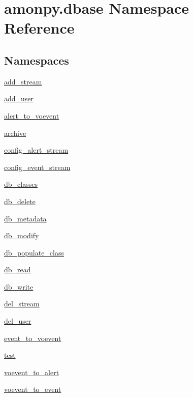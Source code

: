 \hypertarget{namespaceamonpy_1_1dbase}{\section{amonpy.\-dbase Namespace Reference}
\label{namespaceamonpy_1_1dbase}
}
\subsection*{Namespaces}
\begin{DoxyCompactItemize}
\item 
\hyperlink{namespaceamonpy_1_1dbase_1_1add__stream}{add\-\_\-stream}
\item 
\hyperlink{namespaceamonpy_1_1dbase_1_1add__user}{add\-\_\-user}
\item 
\hyperlink{namespaceamonpy_1_1dbase_1_1alert__to__voevent}{alert\-\_\-to\-\_\-voevent}
\item 
\hyperlink{namespaceamonpy_1_1dbase_1_1archive}{archive}
\item 
\hyperlink{namespaceamonpy_1_1dbase_1_1config__alert__stream}{config\-\_\-alert\-\_\-stream}
\item 
\hyperlink{namespaceamonpy_1_1dbase_1_1config__event__stream}{config\-\_\-event\-\_\-stream}
\item 
\hyperlink{namespaceamonpy_1_1dbase_1_1db__classes}{db\-\_\-classes}
\item 
\hyperlink{namespaceamonpy_1_1dbase_1_1db__delete}{db\-\_\-delete}
\item 
\hyperlink{namespaceamonpy_1_1dbase_1_1db__metadata}{db\-\_\-metadata}
\item 
\hyperlink{namespaceamonpy_1_1dbase_1_1db__modify}{db\-\_\-modify}
\item 
\hyperlink{namespaceamonpy_1_1dbase_1_1db__populate__class}{db\-\_\-populate\-\_\-class}
\item 
\hyperlink{namespaceamonpy_1_1dbase_1_1db__read}{db\-\_\-read}
\item 
\hyperlink{namespaceamonpy_1_1dbase_1_1db__write}{db\-\_\-write}
\item 
\hyperlink{namespaceamonpy_1_1dbase_1_1del__stream}{del\-\_\-stream}
\item 
\hyperlink{namespaceamonpy_1_1dbase_1_1del__user}{del\-\_\-user}
\item 
\hyperlink{namespaceamonpy_1_1dbase_1_1event__to__voevent}{event\-\_\-to\-\_\-voevent}
\item 
\hyperlink{namespaceamonpy_1_1dbase_1_1test}{test}
\item 
\hyperlink{namespaceamonpy_1_1dbase_1_1voevent__to__alert}{voevent\-\_\-to\-\_\-alert}
\item 
\hyperlink{namespaceamonpy_1_1dbase_1_1voevent__to__event}{voevent\-\_\-to\-\_\-event}
\end{DoxyCompactItemize}
